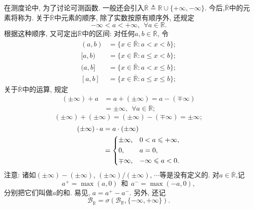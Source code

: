 在测度论中, 为了讨论可测函数. 一般还会引入$\overline{\mathbb{R}}\triangleq \mathbb{R}\cup\{+\infty,-\infty\}$. 今后,$\overline{\mathbb{R}}$中的元素将称为. 关于$\overline{\mathbb{R}}$中元素的顺序, 除了实数按原有顺序外, 还规定
\begin{equation}
	-\infty<a<+\infty,~~\forall a\in\mathbb{R}.
\end{equation}
根据这种顺序, 又可定出$\overline{\mathbb{R}}$中的区间: 对任何$a,b\in\overline{\mathbb{R}}$, 令
\begin{align}
	(a,b) &= \{x\in\overline{\mathbb{R}}:a<x<b\};\nonumber\\
	[a,b) &= \{x\in\overline{\mathbb{R}}:a\leqslant x<b\};\nonumber\\
	(a,b] &= \{x\in\overline{\mathbb{R}}:a<x\leqslant b\};\nonumber\\
	[a,b] &= \{x\in\overline{\mathbb{R}}:a\leqslant x\leqslant b\};
\end{align}
关于$\overline{\mathbb{R}}$中的运算, 规定
\begin{align}
	(\pm\infty)+a &= a+(\pm\infty) = a-(\mp\infty)\nonumber\\
	&= \pm\infty,~~\forall a\in\mathbb{R};
\end{align}
\begin{equation}
	(\pm\infty) + (\pm\infty) = (\pm\infty) - (\mp\infty) = \pm\infty;
\end{equation}
\begin{align}
(\pm\infty)\cdot a &= a\cdot(\pm\infty) \nonumber\\
&= \begin{dcases}
	\pm\infty,&0<a\leqslant +\infty,\\
	0,&a=0,\\
	\mp\infty,&-\infty\leqslant a<0.
\end{dcases}
\end{align}
注意: 诸如$(\pm\infty)-(\pm\infty)$, $(\pm\infty)/(\pm\infty)$, $\cdots$等是没有定义的. 对$a\in\overline{\mathbb{R}}$,记
\begin{equation}
	a^+ = \max(a,0)~~\text{和}~~a^- = \max(-a,0),
\end{equation}
分别把它们叫做$a$的和. 易见, $a = a^+ - a^-$. 另外, 还记
\begin{equation}
	\mathscr{B}_{\overline{\mathbb{R}}} = \sigma(\mathscr{B}_{\mathbb{R}},\{-\infty,+\infty\}).
\end{equation}

